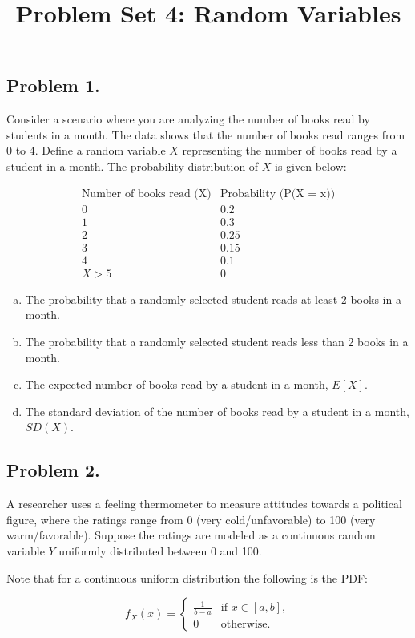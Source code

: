 \documentclass{article}
\title{Problem Set 4: Random Variables}
\author{}
\date{}
\begin{document}
\maketitle

\subsection*{Problem 1.}
Consider a scenario where you are analyzing the number of books read by students in a month. The data shows that the number of books read ranges from 0 to 4. Define a random variable \(X\) representing the number of books read by a student in a month. The probability distribution of \(X\) is given below:

\[
\begin{array}{c|c}
\text{Number of books read (X)} & \text{Probability (P(X = x))} \\
\hline
0 & 0.2 \\
1 & 0.3 \\
2 & 0.25 \\
3 & 0.15 \\
4 & 0.1 \\
X >5 & 0
\end{array}
\]

\begin{enumerate}[a)]
\item The probability that a randomly selected student reads at least 2 books in a month.
\item The probability that a randomly selected student reads less than 2 books in a month.
\item The expected number of books read by a student in a month, \(E[X]\).
\item The standard deviation of the number of books read by a student in a month, \(SD(X)\).
\end{enumerate}

\subsection*{Problem 2.}
A researcher uses a feeling thermometer to measure attitudes towards a political figure, where the ratings range from 0 (very cold/unfavorable) to 100 (very warm/favorable). Suppose the ratings are modeled as a continuous random variable \(Y\) uniformly distributed between 0 and 100.

Note that for a continuous uniform distribution the following is the PDF:

\[
f_X(x) =
\begin{cases}
\frac{1}{b-a} & \text{if } x \in [a, b], \\
0 & \text{otherwise}.
\end{cases}
\]
\end{document}
